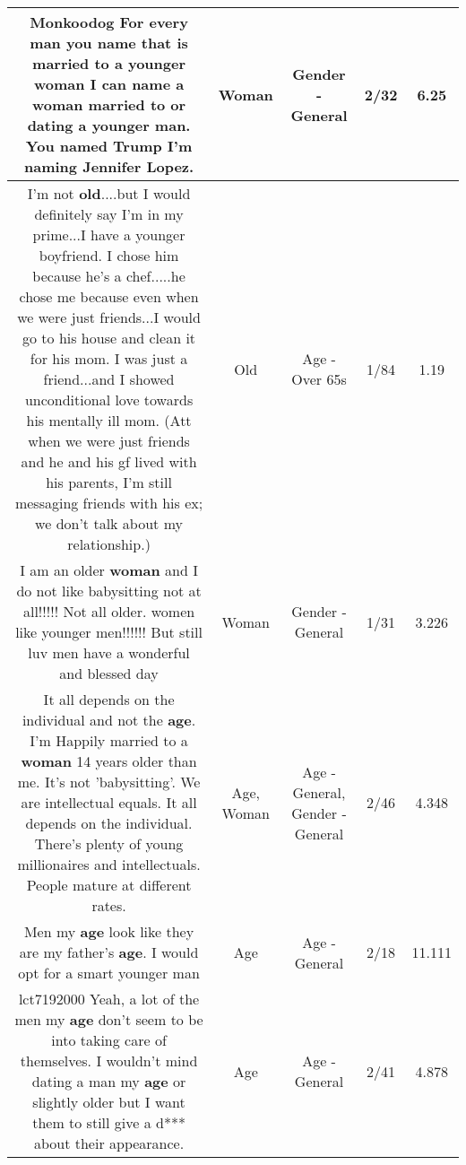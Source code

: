 \documentclass[11pt]{article}
\newlength\mylength
\begin{document}
\begin{center}
\begin{longtable}{|C{.65\mylength}|C{.30\mylength}|C{.12\mylength}|C{.12\mylength}|C{.12\mylength}|}
  \small Monkoodog For every man you name that is married to a younger \textbf{woman} I can name a \textbf{woman} married to or dating a younger man. You named Trump I'm naming Jennifer Lopez.\normalsize   & Woman & Gender - General & 2/32 & 6.25 \\  \hline
  \small I'm not \textbf{old}....but I would definitely say I'm in my prime...I have a younger boyfriend. I chose him because he's a chef.....he chose me because even when we were just friends...I would go to his house and clean it for his mom. I was just a friend...and I showed unconditional love towards his mentally ill mom.  (Att when we were just friends and he and his gf lived with his parents, I'm still messaging friends with his ex; we don't talk about my relationship.)\normalsize   & Old & Age - Over 65s & 1/84 & 1.19 \\  \hline
  \small I am an older \textbf{woman} and I do not like babysitting not at all!!!!! Not all  older. women like younger men!!!!!! But still luv men have a wonderful and blessed day\normalsize   & Woman & Gender - General & 1/31 & 3.226 \\  \hline
  \small It all depends on the individual and not the \textbf{age}. I'm Happily married to a \textbf{woman} 14 years older than me. It's not 'babysitting'. We are intellectual equals. It all depends on the individual. There's plenty of young millionaires and intellectuals. People mature at different rates.\normalsize   & Age, Woman & Age - General, Gender - General & 2/46 & 4.348 \\  \hline
  \small Men my \textbf{age} look like they are my father's \textbf{age}.  I would opt for a smart younger man\normalsize   & Age & Age - General & 2/18 & 11.111 \\  \hline
  \small lct7192000   Yeah, a lot of the men my \textbf{age} don't seem to be into taking care of themselves.  I wouldn't mind dating a man my \textbf{age} or slightly older but I want them to still give a d*** about their appearance.\normalsize   & Age & Age - General & 2/41 & 4.878 \\  \hline

\end{longtable}
\end{center}
\end{document}
